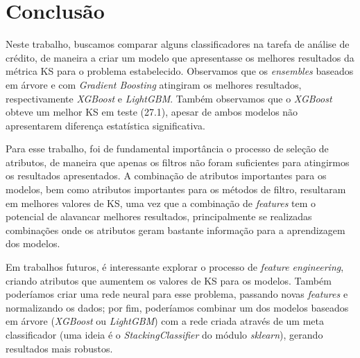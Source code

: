 \section{Conclusão}

Neste trabalho, buscamos comparar alguns classificadores na tarefa de análise de crédito, de maneira a criar um modelo que apresentasse os melhores resultados da métrica KS para o problema estabelecido. Observamos que os \textit{ensembles} baseados em árvore e com \textit{Gradient Boosting} atingiram os melhores resultados, respectivamente \textit{XGBoost} e \textit{LightGBM}. Também observamos que o \textit{XGBoost} obteve um melhor KS em teste (27.1), apesar de ambos modelos não apresentarem diferença estatística significativa.

Para esse trabalho, foi de fundamental importância o processo de seleção de atributos, de maneira que apenas os filtros não foram suficientes para atingirmos os resultados apresentados. A combinação de atributos importantes para os modelos, bem como atributos importantes para os métodos de filtro, resultaram em melhores valores de KS, uma vez que a combinação de \textit{features} tem o potencial de alavancar melhores resultados, principalmente se realizadas combinações onde os atributos geram bastante informação para a aprendizagem dos modelos.

Em trabalhos futuros, é interessante explorar o processo de \textit{feature engineering}, criando atributos que aumentem os valores de KS para os modelos. Também poderíamos criar uma rede neural para esse problema, passando novas \textit{features} e normalizando os dados; por fim, poderíamos combinar um dos modelos baseados em árvore (\textit{XGBoost} ou \textit{LightGBM}) com a rede criada através de um meta classificador (uma ideia é o \textit{StackingClassifier} do módulo \textit{sklearn}), gerando resultados mais robustos.